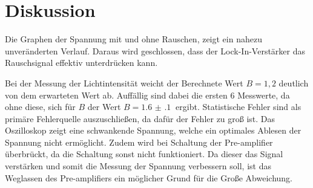 \section{Diskussion}
\label{sec:Diskussion}




Die Graphen der Spannung mit und ohne Rauschen, zeigt ein nahezu unveränderten Verlauf. Daraus wird geschlossen, dass der
Lock-In-Verstärker das Rauschsignal effektiv unterdrücken kann.

Bei der Messung der Lichtintensität weicht der Berechnete Wert $B=1,2$ deutlich von dem erwarteten Wert ab. Auffällig sind dabei
die ersten 6 Messwerte, da ohne diese, sich für $B$ der Wert $B= \SI{1.6(1)}{}$ ergibt. Statistische Fehler sind
als primäre Fehlerquelle auszuschließen, da dafür der Fehler zu groß ist. Das Oszilloskop zeigt eine schwankende Spannung, welche
ein optimales Ablesen der Spannung nicht ermöglicht. Zudem wird bei Schaltung der Pre-amplifier überbrückt, da die Schaltung sonst nicht
funktioniert. Da dieser das Signal verstärken und somit die Messung der Spannung verbessern soll, ist das Weglassen des 
Pre-amplifiers ein möglicher Grund für die Große Abweichung.
